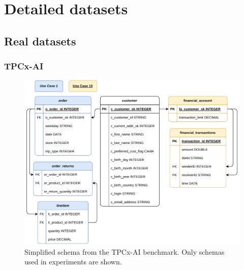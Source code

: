 \chapter{Detailed datasets}


\section{Real datasets}
\subsection{TPCx-AI}

\begin{figure}[ht]
    \centering
    \includegraphics[width=0.99\linewidth]{appendices/figures/tpc-ai-schema.pdf}
    \caption{Simplified schema from the TPCx-AI \cite{tpcx-ai} benchmark. Only schemas used in experiments are shown.}
    \label{fig:appendix-tpc-ai-schema}
\end{figure}
